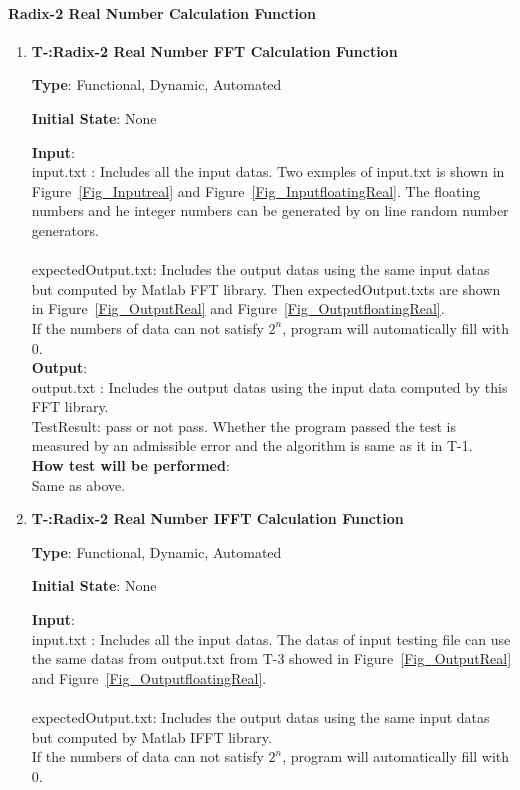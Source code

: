 \documentclass[12pt, titlepage]{article}
\newcounter{tnum}
\begin{document}
\paragraph{Radix-2 Real Number Calculation Function\\}

\begin{enumerate}

\item{\textbf{T-\thetnum \label{R2RFFT}:Radix-2 Real Number FFT Calculation Function}}

\textbf {Type}: Functional, Dynamic, Automated
					
\textbf {Initial State}: None
					
\textbf {Input}:\\{\large input.txt} :  Includes all the input datas. Two exmples of input.txt is shown in Figure~\ref{Fig_Inputreal} and Figure~\ref{Fig_InputfloatingReal}. The floating numbers and he integer numbers can be generated by on line random number generators.\\\\
{\large expectedOutput.txt}:  Includes the output datas using the same input datas but computed by Matlab FFT library. Then expectedOutput.txts  are shown in Figure~\ref{Fig_OutputReal} and Figure~\ref{Fig_OutputfloatingReal}. \\ 
If the numbers of data can not satisfy $2^n$, program will automatically fill with 0.\\
					
\textbf {Output}: \\{\large output.txt} : Includes the output datas using the input data computed by this FFT library.\\
{\large TestResult}: pass or not pass. Whether the program passed the test is measured by an admissible error and the algorithm is same as it in T-1.\\
					
\textbf {How test will be performed}: \\
Same as above.

\item{\textbf{T-\thetnum \label{R2RIFFT}:Radix-2 Real Number IFFT Calculation Function}}

\textbf {Type}: Functional, Dynamic, Automated
					
\textbf {Initial State}: None
										
\textbf {Input}:\\{\large input.txt} :  Includes all the input datas. The datas of  input testing file can use the same datas from output.txt from T-3 showed  in Figure~\ref{Fig_OutputReal} and Figure~\ref{Fig_OutputfloatingReal}.\\\\
{\large expectedOutput.txt}:  Includes the output datas using the same input datas but computed by Matlab IFFT library. \\ 
If the numbers of data can not satisfy $2^n$, program will automatically fill with 0.\\
					

\end{enumerate}
\end{document}
